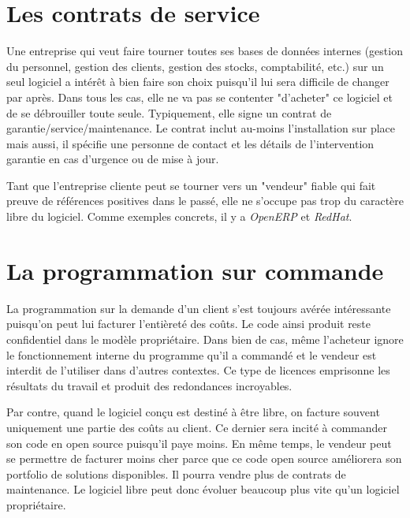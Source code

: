 \section*{Les contrats de service}
Une entreprise qui veut faire tourner toutes ses bases de données internes (gestion du personnel,
gestion des clients, gestion des stocks, comptabilité, etc.) sur un seul logiciel a intérêt à bien faire son choix puisqu'il lui sera difficile de changer par après.%
Dans tous les cas, elle ne va pas se contenter "d'acheter" ce logiciel et de se débrouiller toute seule.
Typiquement, elle signe un contrat de garantie/service/maintenance. %
Le contrat inclut au-moins l'installation sur place mais aussi, il spécifie une personne de contact et les détails de l'intervention garantie en cas d'urgence ou de mise à jour.

Tant que l'entreprise cliente peut se tourner vers un "vendeur" fiable qui fait preuve de références 
positives dans le passé, elle ne s'occupe pas trop du caractère libre du logiciel. 
Comme exemples concrets, il y a \textit{OpenERP} et \textit{RedHat}.

\section*{La programmation sur commande}
La programmation sur la demande d'un client %
s'est toujours avérée intéressante puisqu'on
peut lui facturer l'entièreté des coûts. Le code ainsi produit reste confidentiel dans le
modèle propriétaire. Dans bien de cas, même l'acheteur ignore le fonctionnement 
interne du programme qu'il a commandé et le vendeur est interdit de l'utiliser dans d'autres contextes.
Ce type de licences emprisonne les résultats du travail et produit des redondances incroyables.

Par contre, quand le logiciel conçu est destiné à être libre, on facture souvent uniquement une partie 
des coûts au client. Ce dernier sera incité à commander son code en open source puisqu'il paye moins. %
En même temps, le vendeur peut se permettre de facturer moins cher parce que ce code open source
améliorera son portfolio de solutions disponibles. Il pourra vendre plus de contrats de maintenance.
Le logiciel libre peut donc évoluer beaucoup plus vite qu'un logiciel propriétaire.

